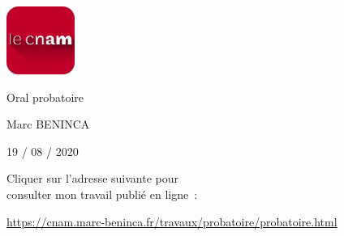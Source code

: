 \documentclass[20pt]{extarticle}
\begin{document}
\begin{titlepage}

\begin{center}

\includegraphics[height=6em]{cnam.png}

{\bfseries

\huge{Oral probatoire}

\large{Marc BENINCA}

\large{19 / 08 / 2020}

}

\end{center}

Cliquer sur l’adresse suivante pour\\
consulter mon travail publié en ligne :

\url{https://cnam.marc-beninca.fr/travaux/probatoire/probatoire.html}

\end{titlepage}
\end{document}
